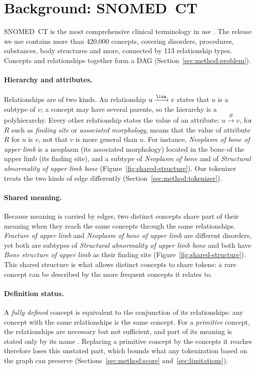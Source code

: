 \section{Background: SNOMED~CT}
\label{sec:background}
\label{sec:snomed}

SNOMED~CT is the most comprehensive clinical terminology in use \cite{snomed2024starter}.
The release we use contains more than 420,000 concepts, covering disorders, procedures, substances, body structures and more, connected by 113 relationship types.
Concepts and relationships together form a DAG (Section~\ref{sec:method:problem}).

\paragraph{Hierarchy and attributes.}
Relationships are of two kinds.
An \isa{} relationship $u \xrightarrow{\isa} v$ states that $u$ is a subtype of $v$; a concept may have several parents, so the hierarchy is a polyhierarchy.
Every other relationship states the value of an attribute: $u \xrightarrow{R} v$, for $R$ such as \emph{finding site} or \emph{associated morphology}, means that the value of attribute $R$ for $u$ is $v$, not that $v$ is more general than $u$.
For instance, \emph{Neoplasm of bone of upper limb} is a neoplasm (its associated morphology) located in the bone of the upper limb (its finding site), and a subtype of \emph{Neoplasm of bone} and of \emph{Structural abnormality of upper limb bone} (Figure~\ref{fig:shared-structure}).
Our tokenizer treats the two kinds of edge differently (Section~\ref{sec:method:tokenizer}).

\paragraph{Shared meaning.}
Because meaning is carried by edges, two distinct concepts share part of their meaning when they reach the same concepts through the same relationships.
\emph{Fracture of upper limb} and \emph{Neoplasm of bone of upper limb} are different disorders, yet both are subtypes of \emph{Structural abnormality of upper limb bone} and both have \emph{Bone structure of upper limb} as their finding site (Figure~\ref{fig:shared-structure}).
This shared structure is what allows distinct concepts to share tokens: a rare concept can be described by the more frequent concepts it relates to.

\paragraph{Definition status.}
A \emph{fully defined} concept is equivalent to the conjunction of its relationships: any concept with the same relationships is the same concept.
For a \emph{primitive} concept, the relationships are necessary but not sufficient, and part of its meaning is stated only by its name \cite{snomed2024editorial}.
Replacing a primitive concept by the concepts it reaches therefore loses this unstated part, which bounds what any tokenization based on the graph can preserve (Sections~\ref{sec:method:score} and~\ref{sec:limitations}).

